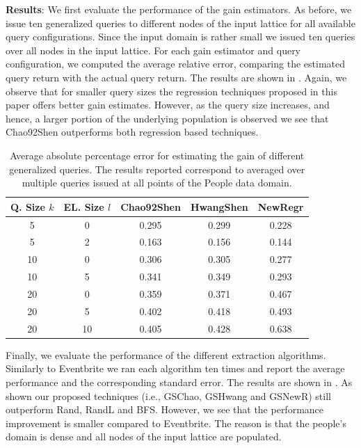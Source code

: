 \noindent\textbf{Results}: We first evaluate the performance of the gain estimators. As before, we issue ten generalized queries to different nodes of the input lattice for all available query configurations. Since the input domain is rather small we issued ten queries over all nodes in the input lattice. For each gain estimator and query configuration, we computed the average relative error, comparing the estimated query return with the actual query return. The results are shown in . Again, we observe that for smaller query sizes the regression techniques proposed in this paper offers better gain estimates. However, as the query size increases, and hence, a larger portion of the underlying population is observed we see that Chao92Shen outperforms both regression based techniques. 

\begin{table}
\small\center
\caption{Average absolute percentage error for estimating the gain of different generalized queries. The results reported correspond to  averaged over multiple queries issued at all points of the People data domain.}
\label{tab:peopleesterror}
\begin{tabular}{|c|c|c|c|c|}
\hline
\textbf{Q. Size $k$} & \textbf{EL. Size $l$} & \textbf{Chao92Shen} & \textbf{HwangShen} & \textbf{NewRegr} \\ \hline
5 & 0 & 0.295 & 0.299 & 0.228\\
5 & 2 & 0.163 &  0.156 & 0.144\\
10 & 0 &  0.306 & 0.305 & 0.277\\
10 & 5 &  0.341 & 0.349 & 0.293\\
20 & 0 &  0.359& 0.371 & 0.467 \\
20 & 5 &  0.402 & 0.418 & 0.493\\
20 & 10 & 0.405 & 0.428 & 0.638\\
\hline
\end{tabular}
\vspace{-10pt}
\end{table}

Finally, we evaluate the performance of the different extraction algorithms. Similarly to Eventbrite we ran each algorithm ten times and report the average performance and the corresponding standard error. The results are shown in . As shown our proposed techniques (i.e., GSChao, GSHwang and GSNewR) still outperform Rand, RandL and BFS. However, we see that the performance improvement is smaller compared to Eventbrite. The reason is that the people's domain is dense and all nodes of the input lattice are populated. 


